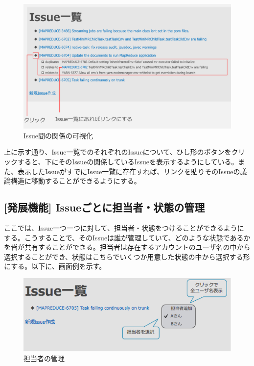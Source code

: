 \documentclass[12pt, oneside]{jreport}
\begin{document}
		\begin{figure}[H]
		\centering
		\includegraphics[width=17cm,bb=300 300 -200 27]{RelatesVisualize.png}
		\caption{Issue間の関係の可視化}
		\end{figure}
		
		上に示す通り、Issue一覧でのそれぞれのIssueについて、ひし形のボタンをクリックすると、下にそのIssueの関係しているIssueを表示するようにしている。また、表示したIssueがすでにIssue一覧に存在すれば、リンクを貼りそのIssueの議論構造に移動することができるようにする。

		\subsection{[発展機能] Issueごとに担当者・状態の管理}
		ここでは、Issue一つ一つに対して、担当者・状態をつけることができるようにする。こうすることで、そのIssueは誰が管理していて、どのような状態であるかを皆が共有することができる。担当者は存在するアカウントのユーザ名の中から選択することができ、状態はこちらでいくつか用意した状態の中から選択する形にする。以下に、画面例を示す。
		
		\begin{figure}[H]
		\centering
		\includegraphics[width=17cm,bb=500 300 -200 27]{IssueManager.png}
		\caption{担当者の管理}
		\end{figure}
		
\end{document}
